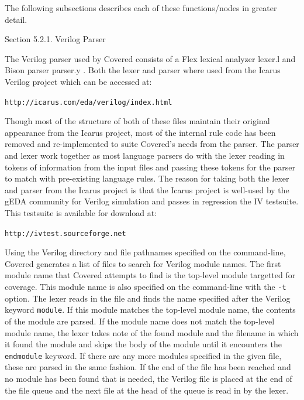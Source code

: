  \begin{Desc}
\item[]The following subsections describes each of these functions/nodes in greater detail.\end{Desc}
\begin{Desc}
\item[Section 5.2.1. Verilog Parser]\end{Desc}
\begin{Desc}
\item[]The Verilog parser used by Covered consists of a Flex lexical analyzer lexer.l and Bison parser parser.y . Both the lexer and parser where used from the Icarus Verilog project which can be accessed at:\end{Desc}
\begin{Desc}
\item[]{\tt http://icarus.com/eda/verilog/index.html}\end{Desc}
\begin{Desc}
\item[]Though most of the structure of both of these files maintain their original appearance from the Icarus project, most of the internal rule code has been removed and re-implemented to suite Covered's needs from the parser. The parser and lexer work together as most language parsers do with the lexer reading in tokens of information from the input files and passing these tokens for the parser to match with pre-existing language rules. The reason for taking both the lexer and parser from the Icarus project is that the Icarus project is well-used by the g\-EDA community for Verilog simulation and passes in regression the IV testsuite. This testsuite is available for download at:\end{Desc}
\begin{Desc}
\item[]{\tt http://ivtest.sourceforge.net}\end{Desc}
\begin{Desc}
\item[]Using the Verilog directory and file pathnames specified on the command-line, Covered generates a list of files to search for Verilog module names. The first module name that Covered attempts to find is the top-level module targetted for coverage. This module name is also specified on the command-line with the {\tt -t} option. The lexer reads in the file and finds the name specified after the Verilog keyword {\tt module}. If this module matches the top-level module name, the contents of the module are parsed. If the module name does not match the top-level module name, the lexer takes note of the found module and the filename in which it found the module and skips the body of the module until it encounters the {\tt endmodule} keyword. If there are any more modules specified in the given file, these are parsed in the same fashion. If the end of the file has been reached and no module has been found that is needed, the Verilog file is placed at the end of the file queue and the next file at the head of the queue is read in by the lexer.\end{Desc}

